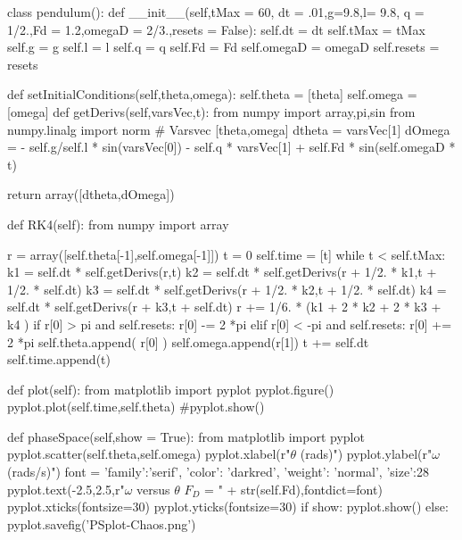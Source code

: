 \begin{codeexample}
\begin{VerbatimOut}{\listingFile}
class pendulum():
    def __init__(self,tMax = 60, dt = .01,g=9.8,l= 9.8, q = 1/2.,Fd = 1.2,omegaD = 2/3.,resets = False):
        self.dt = dt
        self.tMax = tMax
        self.g = g
        self.l = l
        self.q = q
        self.Fd = Fd
        self.omegaD = omegaD
        self.resets = resets

    def setInitialConditions(self,theta,omega):
        self.theta = [theta]
        self.omega = [omega]
    def getDerivs(self,varsVec,t):
        from numpy import array,pi,sin
        from numpy.linalg import norm
        # Varsvec [theta,omega]
        dtheta = varsVec[1]
        dOmega = - self.g/self.l * sin(varsVec[0]) - self.q * varsVec[1] + self.Fd * sin(self.omegaD * t)

        return array([dtheta,dOmega])


    def RK4(self):
        from numpy import array

        r = array([self.theta[-1],self.omega[-1]])
        t = 0
        self.time = [t]
        while t < self.tMax:
            k1 = self.dt * self.getDerivs(r,t)
            k2 = self.dt * self.getDerivs(r + 1/2. * k1,t + 1/2. * self.dt)
            k3 = self.dt * self.getDerivs(r + 1/2. * k2,t + 1/2. * self.dt)
            k4 = self.dt * self.getDerivs(r + k3,t +  self.dt)
            r += 1/6. * (k1 + 2 * k2 + 2 * k3 + k4 )
            if r[0] > pi and self.resets:
                r[0] -= 2 *pi
            elif r[0] < -pi and self.resets:
                r[0] += 2 *pi
            self.theta.append( r[0]  )
            self.omega.append(r[1])
            t += self.dt
            self.time.append(t)



    def plot(self):
        from matplotlib import pyplot
        pyplot.figure()
        pyplot.plot(self.time,self.theta)
        #pyplot.show()

    def phaseSpace(self,show = True):
        from matplotlib import pyplot
        pyplot.scatter(self.theta,self.omega)
        pyplot.xlabel(r"$\theta$ (rads)")
        pyplot.ylabel(r"$\omega$ (rads/s)")
        font = {'family':'serif',
                'color': 'darkred',
                'weight': 'normal',
                'size':28}
        pyplot.text(-2.5,2.5,r"$\omega$ versus $\theta$     $F_D$ = " + str(self.Fd),fontdict=font)
        pyplot.xticks(fontsize=30)
        pyplot.yticks(fontsize=30)
        if show:
            pyplot.show()
        else:
            pyplot.savefig('PSplot-Chaos.png')



\end{VerbatimOut}
\end{codeexample}
